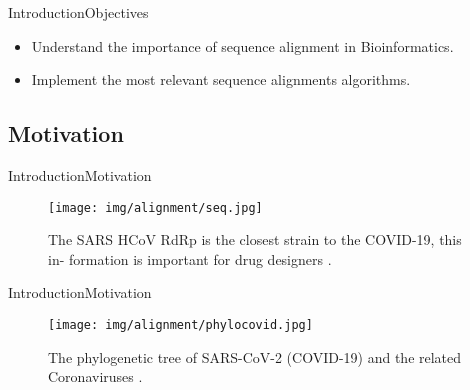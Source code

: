 \documentclass[10pt]{beamer}
\newcommand{\1}{
	\setbeamertemplate{background}{
		\texttt{[image: img/1]}
		\tikz[overlay] \fill[fill opacity=0.75,fill=white] (0,0) rectangle (-\paperwidth,\paperheight);
	}
}
\begin{document}
\begin{frame}{Introduction}{Objectives}
\begin{itemize}
    \item<1-> Understand the importance of sequence alignment in Bioinformatics. 
    \item<2-> Implement the most relevant sequence alignments algorithms.
  \end{itemize}
\end{frame}

\subsection{Motivation}

\begin{frame}{Introduction}{Motivation}
\begin{figure}[]
 \centering
    \texttt{[image: img/alignment/seq.jpg]}
    \label{img:mot2}
    \caption{The SARS HCoV RdRp is the closest strain to the COVID-19, this in-
formation is important for drug designers \cite{elfiky2020anti}.}
\end{figure}
\end{frame}

\begin{frame}{Introduction}{Motivation}
\begin{figure}[]
 \centering
    \texttt{[image: img/alignment/phylocovid.jpg]}
    \label{img:mot2}
    \caption{The phylogenetic tree of SARS-CoV-2 (COVID-19) and the related Coronaviruses  \cite{tang2020origin}.}
\end{figure}
\end{frame}
\end{document}
